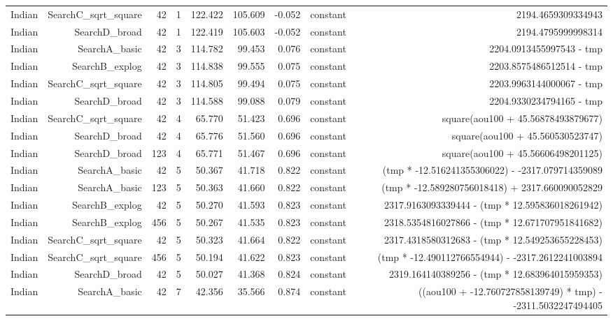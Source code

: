 \begin{table}
{\begin{tabular}{lrrrrrrrr}
Indian & SearchC\_sqrt\_square & 42 & 1 & 122.422 & 105.609 & -0.052 & constant & 2194.4659309334943 \\
Indian & SearchD\_broad & 42 & 1 & 122.419 & 105.603 & -0.052 & constant & 2194.4795999998314 \\
Indian & SearchA\_basic & 42 & 3 & 114.782 & 99.453 & 0.076 & constant & 2204.0913455997543 - tmp \\
Indian & SearchB\_explog & 42 & 3 & 114.838 & 99.555 & 0.075 & constant & 2203.8575486512514 - tmp \\
Indian & SearchC\_sqrt\_square & 42 & 3 & 114.805 & 99.494 & 0.075 & constant & 2203.9963144000067 - tmp \\
Indian & SearchD\_broad & 42 & 3 & 114.588 & 99.088 & 0.079 & constant & 2204.9330234794165 - tmp \\
Indian & SearchC\_sqrt\_square & 42 & 4 & 65.770 & 51.423 & 0.696 & constant & square(aou100 + 45.56878493879677) \\
Indian & SearchD\_broad & 42 & 4 & 65.776 & 51.560 & 0.696 & constant & square(aou100 + 45.560530523747) \\
Indian & SearchD\_broad & 123 & 4 & 65.771 & 51.467 & 0.696 & constant & square(aou100 + 45.56606498201125) \\
Indian & SearchA\_basic & 42 & 5 & 50.367 & 41.718 & 0.822 & constant & (tmp * -12.516241355306022) - -2317.079714359089 \\
Indian & SearchA\_basic & 123 & 5 & 50.363 & 41.660 & 0.822 & constant & (tmp * -12.589280756018418) + 2317.660090052829 \\
Indian & SearchB\_explog & 42 & 5 & 50.270 & 41.593 & 0.823 & constant & 2317.9163093339444 - (tmp * 12.595836018261942) \\
Indian & SearchB\_explog & 456 & 5 & 50.267 & 41.535 & 0.823 & constant & 2318.5354816027866 - (tmp * 12.671707951841682) \\
Indian & SearchC\_sqrt\_square & 42 & 5 & 50.323 & 41.664 & 0.822 & constant & 2317.4318580312683 - (tmp * 12.549253655228453) \\
Indian & SearchC\_sqrt\_square & 456 & 5 & 50.194 & 41.622 & 0.823 & constant & (tmp * -12.490112766554944) - -2317.2612241003894 \\
Indian & SearchD\_broad & 42 & 5 & 50.027 & 41.368 & 0.824 & constant & 2319.164140389256 - (tmp * 12.683964015959353) \\
Indian & SearchA\_basic & 42 & 7 & 42.356 & 35.566 & 0.874 & constant & ((aou100 + -12.760727858139749) * tmp) - -2311.5032247494405 \\

\end{tabular}}
\end{table}
